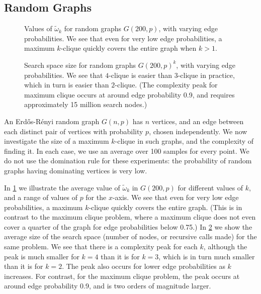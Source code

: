 \documentclass[letterpaper]{article}
\begin{document}
\subsection{Random Graphs}

\begin{figure}[t]
    \centering
    
    \caption{Values of $\tilde{\omega}_k$ for random graphs $G(200, p)$, with varying edge probabilities.
        We see that even for very low edge probabilities, a maximum $k$-clique
    quickly covers the entire graph when $k > 1$.}
    \label{figure:graph-omega}
\end{figure}

\begin{figure}[t]
    \centering
    
    \caption{Search space size for random graphs $G(200, p)^k$, with varying edge probabilities. We see that
        $4$-clique is easier than $3$-clique in practice, which in turn is easier than $2$-clique. (The
        complexity peak for maximum clique occurs at around edge probability 0.9, and requires
        approximately 15 million search nodes.)}
    \label{figure:graph-nodes}
\end{figure}

An Erd\H{o}s-R\'{e}nyi random graph $G(n, p)$ has $n$ vertices, and an edge between each distinct
pair of vertices with probability $p$, chosen independently. We now investigate the size of a
maximum $k$-clique in such graphs, and the complexity of finding it. In each case, we use an average
over 100 samples for every point.  We do not use the domination rule for these experiments: the
probability of random graphs having dominating vertices is very low.

In \cref{figure:graph-omega} we illustrate the average value of $\tilde{\omega}_k$ in $G(200,
p)$ for different values of $k$, and a range of values of $p$ for the $x$-axis. We see that even for
very low edge probabilities, a maximum $k$-clique quickly covers the entire graph.  (This is in contrast to
the maximum clique problem, where a maximum clique does not even cover a quarter of the graph for
edge probabilities below 0.75.) In \cref{figure:graph-nodes} we show the average size of the
search space (number of nodes, or recursive calls made) for the same problem. We see that there is a
complexity peak for each $k$, although the peak is much smaller for $k = 4$ than it is for $k = 3$,
which is in turn much smaller than it is for $k = 2$. The peak also occurs for lower edge
probabilities as $k$ increases. For contrast, for the maximum clique problem, the peak occurs at
around edge probability 0.9, and is two orders of magnitude larger.
\end{document}
